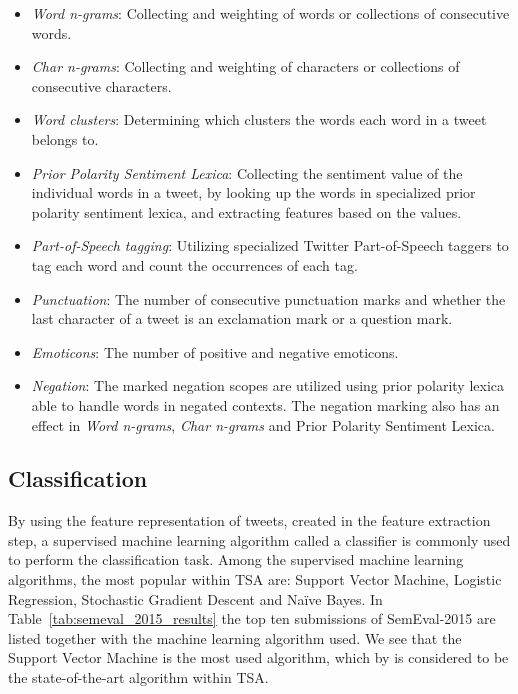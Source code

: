 \begin{itemize}
    \item \textit{Word n-grams}: Collecting and weighting of words or collections of consecutive words.
    \item \textit{Char n-grams}: Collecting and weighting of characters or collections of consecutive characters.
    \item \textit{Word clusters}: Determining which clusters the words each word in a tweet belongs to. 
    \item \textit{Prior Polarity Sentiment Lexica}: Collecting the sentiment value of the individual words in a tweet, by looking up the words in specialized prior polarity sentiment lexica, and extracting features based on the values.
    \item \textit{Part-of-Speech tagging}: Utilizing specialized Twitter Part-of-Speech taggers to tag each word and count the occurrences of each tag.
    \item \textit{Punctuation}: The number of consecutive punctuation marks and whether the last character of a tweet is an exclamation mark or a question mark.
    \item \textit{Emoticons}: The number of positive and negative emoticons.
    \item \textit{Negation}: The marked negation scopes are utilized using prior polarity lexica able to handle words in negated contexts. The negation marking also has an effect in \textit{Word n-grams}, \textit{Char n-grams} and Prior Polarity Sentiment Lexica.
\end{itemize}

\subsection{Classification}
By using the feature representation of tweets, created in the feature extraction step, a supervised machine learning algorithm called a classifier is commonly used to perform the classification task. Among the supervised machine learning algorithms, the most popular within TSA are: Support Vector Machine, Logistic Regression, Stochastic Gradient Descent and Naïve Bayes. In Table~\ref{tab:semeval_2015_results} the top ten submissions of SemEval-2015 are listed together with the machine learning algorithm used. We see that the Support Vector Machine is the most used algorithm, which by \cite{Svetlana14} is considered to be the state-of-the-art algorithm within TSA. \\     

